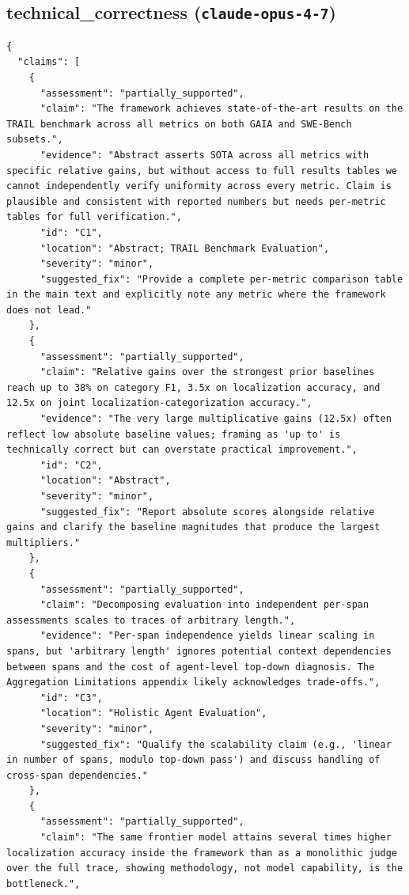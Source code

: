 \documentclass[11pt]{article}
\begin{document}
\subsection*{technical_correctness (\texttt{claude-opus-4-7})}
\begin{verbatim}
{
  "claims": [
    {
      "assessment": "partially_supported",
      "claim": "The framework achieves state-of-the-art results on the TRAIL benchmark across all metrics on both GAIA and SWE-Bench subsets.",
      "evidence": "Abstract asserts SOTA across all metrics with specific relative gains, but without access to full results tables we cannot independently verify uniformity across every metric. Claim is plausible and consistent with reported numbers but needs per-metric tables for full verification.",
      "id": "C1",
      "location": "Abstract; TRAIL Benchmark Evaluation",
      "severity": "minor",
      "suggested_fix": "Provide a complete per-metric comparison table in the main text and explicitly note any metric where the framework does not lead."
    },
    {
      "assessment": "partially_supported",
      "claim": "Relative gains over the strongest prior baselines reach up to 38% on category F1, 3.5x on localization accuracy, and 12.5x on joint localization-categorization accuracy.",
      "evidence": "The very large multiplicative gains (12.5x) often reflect low absolute baseline values; framing as 'up to' is technically correct but can overstate practical improvement.",
      "id": "C2",
      "location": "Abstract",
      "severity": "minor",
      "suggested_fix": "Report absolute scores alongside relative gains and clarify the baseline magnitudes that produce the largest multipliers."
    },
    {
      "assessment": "partially_supported",
      "claim": "Decomposing evaluation into independent per-span assessments scales to traces of arbitrary length.",
      "evidence": "Per-span independence yields linear scaling in spans, but 'arbitrary length' ignores potential context dependencies between spans and the cost of agent-level top-down diagnosis. The Aggregation Limitations appendix likely acknowledges trade-offs.",
      "id": "C3",
      "location": "Holistic Agent Evaluation",
      "severity": "minor",
      "suggested_fix": "Qualify the scalability claim (e.g., 'linear in number of spans, modulo top-down pass') and discuss handling of cross-span dependencies."
    },
    {
      "assessment": "partially_supported",
      "claim": "The same frontier model attains several times higher localization accuracy inside the framework than as a monolithic judge over the full trace, showing methodology, not model capability, is the bottleneck.",

\end{verbatim}
\end{document}
